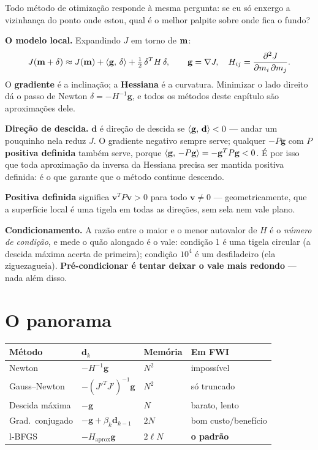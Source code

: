 \documentclass[11pt,a4paper,oneside]{report}
\begin{document}
\begin{matematica}
Todo m\'etodo de otimiza\c{c}\~ao responde \`a mesma pergunta: se eu s\'o
enxergo a vizinhan\c{c}a do ponto onde estou, qual \'e o melhor palpite sobre
onde fica o fundo?

\textbf{O modelo local.} Expandindo $J$ em torno de $\mathbf{m}$:
\[
J(\mathbf{m} + \delta) \approx J(\mathbf{m})
 + \langle \mathbf{g},\,\delta\rangle
 + \tfrac{1}{2}\,\delta^{T}H\,\delta ,
\qquad
\mathbf{g} = \nabla J,\quad
H_{ij} = \frac{\partial^{2}J}{\partial m_i\,\partial m_j}.
\]
O \textbf{gradiente} \'e a inclina\c{c}\~ao; a \textbf{Hessiana} \'e a
curvatura. Minimizar o lado direito d\'a o passo de Newton
$\delta = -H^{-1}\mathbf{g}$, e todos os m\'etodos deste cap\'itulo s\~ao
aproxima\c{c}\~oes dele.

\textbf{Dire\c{c}\~ao de descida.} $\mathbf{d}$ \'e dire\c{c}\~ao de descida
se $\langle \mathbf{g},\,\mathbf{d}\rangle < 0$ --- andar um pouquinho nela reduz $J$.
O gradiente negativo sempre serve; qualquer $-P\mathbf{g}$ com $P$
\textbf{positiva definida} tamb\'em serve, porque
$\langle \mathbf{g},\,-P\mathbf{g}\rangle = -\mathbf{g}^{T}P\mathbf{g} < 0$. \'E por
isso que toda aproxima\c{c}\~ao da inversa da Hessiana precisa ser mantida
positiva definida: \'e o que garante que o m\'etodo continue descendo.

\textbf{Positiva definida} significa $\mathbf{v}^{T}P\mathbf{v} > 0$ para todo
$\mathbf{v}\ne 0$ --- geometricamente, que a superf\'icie local \'e uma tigela
em todas as dire\c{c}\~oes, sem sela nem vale plano.

\textbf{Condicionamento.} A raz\~ao entre o maior e o menor autovalor de $H$
\'e o \emph{n\'umero de condi\c{c}\~ao}, e mede o qu\~ao alongado \'e o vale:
condi\c{c}\~ao 1 \'e uma tigela circular (a descida m\'axima acerta de
primeira); condi\c{c}\~ao $10^{4}$ \'e um desfiladeiro (ela ziguezagueia).
\textbf{Pr\'e-condicionar \'e tentar deixar o vale mais redondo} --- nada
al\'em disso.
\end{matematica}

\section{O panorama}

\begin{center}
\begin{tabular}{@{}llll@{}}
\toprule
\textbf{M\'etodo} & $\mathbf{d}_k$ & \textbf{Mem\'oria} & \textbf{Em FWI} \\
\midrule
Newton           & $-H^{-1}\mathbf{g}$ & $N^{2}$ & imposs\'ivel \\
Gauss--Newton    & $-(J'^{T}J')^{-1}\mathbf{g}$ & $N^{2}$ & s\'o truncado \\
Descida m\'axima & $-\mathbf{g}$ & $N$ & barato, lento \\
Grad.\ conjugado & $-\mathbf{g} + \beta_k\mathbf{d}_{k-1}$ & $2N$ & bom
  custo/benef\'icio \\
l-BFGS           & $-H_{\text{aprox}}\mathbf{g}$ & $2\ell N$ & \textbf{o padr\~ao} \\
\bottomrule
\end{tabular}
\end{center}
\end{document}
